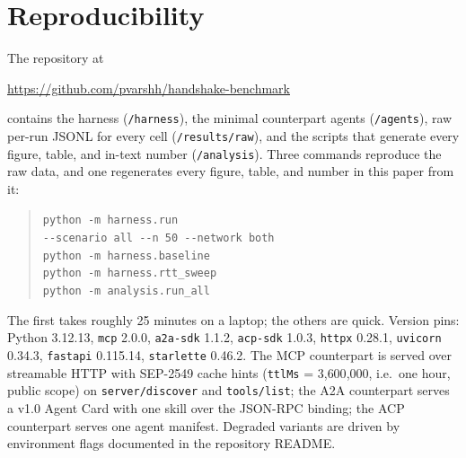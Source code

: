 \documentclass[10pt]{article}
\newcommand{\code}[1]{\mbox{\texttt{#1}}}
\begin{document}





\appendix

\section{Reproducibility}
\label{app:repro}

The repository at

\begin{center}
\url{https://github.com/pvarshh/handshake-benchmark}
\end{center}

\noindent
contains the harness (\texttt{/harness}), the minimal counterpart agents
(\texttt{/agents}), raw per-run JSONL for every cell
(\texttt{/results/raw}), and the scripts that generate every figure,
table, and in-text number (\texttt{/analysis}). Three commands
reproduce the raw data, and one regenerates every figure, table, and
number in this paper from it:

\begin{quote}
\small
\texttt{python -m harness.run\\
\hspace*{1em}-{}-scenario all -{}-n 50 -{}-network both}\\
\texttt{python -m harness.baseline}\\
\texttt{python -m harness.rtt\_sweep}\\
\texttt{python -m analysis.run\_all}
\end{quote}

\noindent
The first takes roughly 25 minutes on a laptop; the others are quick.
Version pins: Python 3.12.13,
\texttt{mcp} 2.0.0, \texttt{a2a-sdk} 1.1.2, \texttt{acp-sdk} 1.0.3,
\texttt{httpx} 0.28.1, \texttt{uvicorn} 0.34.3, \texttt{fastapi}
0.115.14, \texttt{starlette} 0.46.2. The MCP counterpart is served over
streamable HTTP with SEP-2549 cache hints (\code{ttlMs} =
3{,}600{,}000, i.e.\ one hour, public scope) on \code{server/discover}
and \code{tools/list}; the A2A counterpart serves a v1.0 Agent Card
with one skill over the JSON-RPC binding; the ACP counterpart serves one
agent manifest. Degraded variants are driven by environment flags
documented in the repository README.
\end{document}
